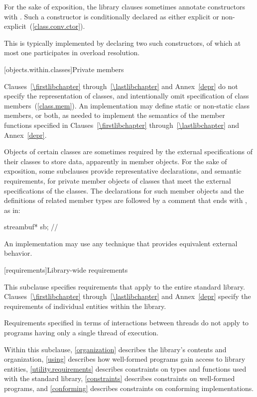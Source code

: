 \pnum
For the sake of exposition, the library clauses sometimes annotate
constructors with \EXPLICIT{}. Such a constructor is conditionally declared
as either explicit or non-explicit~(\ref{class.conv.ctor}).
\begin{note} This is typically implemented by declaring two such constructors,
of which at most one participates in overload resolution. \end{note}

[objects.within.classes]{Private members}

\pnum
Clauses~\ref{\firstlibchapter} through~\ref{\lastlibchapter} and
Annex~\ref{depr} do not specify the representation of classes, and intentionally
omit specification of class members~(\ref{class.mem}). An implementation may
define static or non-static class members, or both, as needed to implement the
semantics of the member functions specified in Clauses~\ref{\firstlibchapter}
through~\ref{\lastlibchapter} and Annex~\ref{depr}.

\pnum
Objects of certain classes are sometimes required by the external specifications of
their classes to store data, apparently in member objects. For the sake of exposition,
some subclauses provide representative declarations, and semantic requirements, for
private member objects of classes that meet the external specifications of the classes.
The declarations for such member objects and the definitions of related member types are
followed by a comment that ends with \expos, as in:

\begin{codeblock}
streambuf* sb;  // \expos
\end{codeblock}

\pnum
An implementation may use any technique that provides equivalent external behavior.

[requirements]{Library-wide requirements}

\pnum
This subclause specifies requirements that apply to the entire \Cpp standard library.
Clauses~\ref{\firstlibchapter} through~\ref{\lastlibchapter} and Annex~\ref{depr}
specify the requirements of individual entities within the library.

\pnum
Requirements specified in terms of interactions between threads do not apply to
programs having only a single thread of execution.

\pnum
Within this subclause, \ref{organization} describes the library's contents and
organization, \ref{using} describes how well-formed \Cpp programs gain access to library
entities,
\ref{utility.requirements} describes constraints on types and functions used with
the \Cpp standard library,
\ref{constraints} describes constraints on well-formed \Cpp programs, and
\ref{conforming} describes constraints on conforming implementations.

